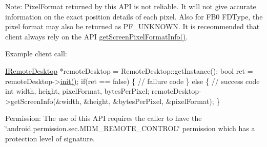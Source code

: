 \-Note\-: \-Pixel\-Format returned by this \-A\-P\-I is not reliable. \-It will not give accurate information on the exact position details of each pixel. \-Also for \-F\-B0 \-F\-D\-Type, the pixel format may also be returned as \-P\-F\-\_\-\-U\-N\-K\-N\-O\-W\-N. \-It is receommended that client always rely on the \-A\-P\-I \hyperlink{classandroid_1_1IRemoteDesktop_a82aa8e2b0f330e519ea9a03f8cf56831}{get\-Screen\-Pixel\-Format\-Info()}.

\-Example client call\-:


\begin{DoxyPre}
  \hyperlink{classandroid_1_1IRemoteDesktop}{IRemoteDesktop} *remoteDesktop = RemoteDesktop::getInstance();
  bool ret = remoteDesktop->\hyperlink{classandroid_1_1IRemoteDesktop_a5792cf8c7fa9eeb8e21f39927d0fed1e}{init()};
  if(ret == false)  \{
     // failure code
  \} else \{
     // success code	 
     int	width, height, pixelFormat, bytesPerPixel;	 
     remoteDesktop->getScreenInfo(&width, &height, &bytesPerPixel, &pixelFormat);
  \}
 \end{DoxyPre}


\begin{DoxyParagraph}{\-Permission\-: }
\-The use of this \-A\-P\-I requires the caller to have the \char`\"{}android.\-permission.\-sec.\-M\-D\-M\-\_\-\-R\-E\-M\-O\-T\-E\-\_\-\-C\-O\-N\-T\-R\-O\-L\char`\"{} permission which has a protection level of signature.
\end{DoxyParagraph}


